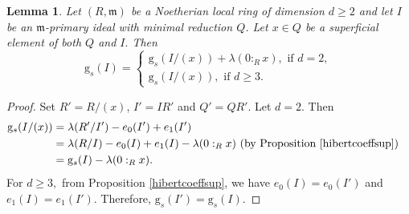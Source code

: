 \documentclass[reqno,a4paper,dvipsnames]{amsart}
\newcommand{\m}{\mathfrak{m} }
\newtheorem{lemma}[theorem]{Lemma}
\theoremstyle{definition}
\begin{document}
\begin{lemma} \label{lemmaa1}
     Let $(R,\m)$ be a Noetherian local ring of dimension $d \geq 2$ and let $I$ be an $\m$-primary ideal with minimal reduction $Q$. Let $x \in Q$ be a superficial element of both $Q$ and $I.$ Then  
\[\mathrm{g}_{s}(I)= \begin{cases}
    \mathrm{g}_{s}(I/(x))+\lambda(0:_{R}x), \text{ if } d=2,\\
    \mathrm{g}_{s}(I/(x)), \text{ if } d\geq3.
\end{cases}\]
\end{lemma}


\begin{proof}
   Set $R'=R/(x)$, $I'=IR'$ and $Q'=QR'.$  Let  $d=2$. Then 
  \begin{align*}
     \mathrm{g}_{s}(I/(x)) 
&=\lambda(R'/I')-e_{0}(I')+e_{1}(I')&\\
 &= \lambda(R/I)-e_{0}(I)+e_{1}(I)-\lambda(0:_{R}x)   \mbox{ (by Proposition \ref{hibertcoeffsup})} \\
 &=\mathrm{g}_{s}(I)-\lambda(0:_{R}x).
  \end{align*}
    For $d \geq 3,$ from Proposition \ref{hibertcoeffsup},  we have $e_{0}(I)=e_{0}(I')$ and  $e_{1}(I)=e_{1}(I')$. Therefore, $\mathrm{g}_{s}(I')=\mathrm{g}_{s}(I).$
\end{proof}
\end{document}
